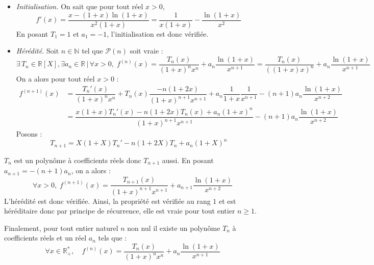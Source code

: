 \documentclass[a4paper,11pt]{report}
\begin{document}
\begin{enumerate}
\begin{itemize}
\item \textit{Initialisation.} On sait que pour tout réel $x>0$,
$$ f'(x) = \dfrac{x-\left(  1+x\right)  \ln\left(
1+x\right)  }{x^{2}\left(  1+x\right)  } = \dfrac{1}{x\left(  1+x\right)  } - \dfrac{ \ln\left(
1+x\right)  }{x^{2}}$$
En posant $T_1=1$ et $a_1=-1$, l'initialisation est donc vérifiée.
\item \textit{Hérédité.} Soit $n \in \mathbb{N}$ tel que $\mathcal{P}(n)$ soit vraie : 
$$ \exists \, T_n \in \mathbb{R}[X], \exists a_n \in \mathbb{R} \, \vert \, \forall x>0, \; f^{\left(  n\right)  }\left(
x\right)  =\dfrac{T_{n}\left(  x\right)  }{\left(  1+x\right)  ^{n}x^{n}%
}+a_{n}\dfrac{\ln\left(  1+x\right)  }{x^{n+1}} = \dfrac{T_{n}\left(  x\right)  }{(\left(  1+x\right) x) ^{n}%
}+a_{n}\dfrac{\ln\left(  1+x\right)  }{x^{n+1}}$$
On a alors pour tout réel $x>0$ :
\begin{align*}
f^{\left(  n+1\right)  }\left(  x\right)   & =\dfrac{T_{n}'\left(
x\right)  }{\left(  1+x\right)  ^{n}x^{n}}+T_{n}(x)\dfrac{-n(1+2x)}{\left(  1+x\right)
^{n+1}x^{n+1}}+a_{n}\dfrac{1}{1+x}\dfrac{1}{x^{n+1}}-\left(  n+1\right)
a_{n}\dfrac{\ln\left(  1+x\right)  }{x^{n+2}}\\
& =\dfrac{x\left(  1+x\right)  T_{n}'\left(  x\right)  -n\left(
1+2x\right)  T_{n}(x)+a_{n}\left(  1+x\right)  ^{n}}{\left(  1+x\right)
^{n+1}x^{n+1}}-\left(  n+1\right)  a_{n}\dfrac{\ln\left(  1+x\right)
}{x^{n+2}}%
\end{align*}
Posons :
$$ T_{n+1} =X\left(  1+X\right)  T_{n}'  -n\left(  1+2X\right)  T_{n}+a_{n}\left(  1+X\right)  ^{n}$$
\end{itemize}
$T_n$ est un polynôme à coefficients réels donc $T_{n+1}$ aussi. En posant $a_{n+1}= -(n+1)a_n$, on a alors :
$$ \forall x>0, \; f^{\left(  n+1\right)  }\left(
x\right)  =\dfrac{T_{n+1}\left(  x\right)  }{\left(  1+x\right)  ^{n+1}x^{n+1}%
}+a_{n+1}\dfrac{\ln\left(  1+x\right)  }{x^{n+2}}$$
L'hérédité est donc vérifiée. Ainsi, la propriété est vérifiée au rang $1$ et est héréditaire donc par principe de récurrence, elle est vraie pour tout entier $n \geq 1$.

\medskip

\noindent Finalement, pour tout entier naturel $n$ non nul il existe un polyn\^ome
$T_{n}$ \`a coefficients r\'eels et un r\'eel $a_{n}$ tels que :%
\[
\boxed{\forall x\in\mathbb{R}_{+}^{*},\quad f^{\left(  n\right)  }\left(
x\right)  =\dfrac{T_{n}\left(  x\right)  }{\left(  1+x\right)  ^{n}x^{n}%
}+a_{n}\dfrac{\ln\left(  1+x\right)  }{x^{n+1}}}
\]



\end{enumerate}
\end{document}
